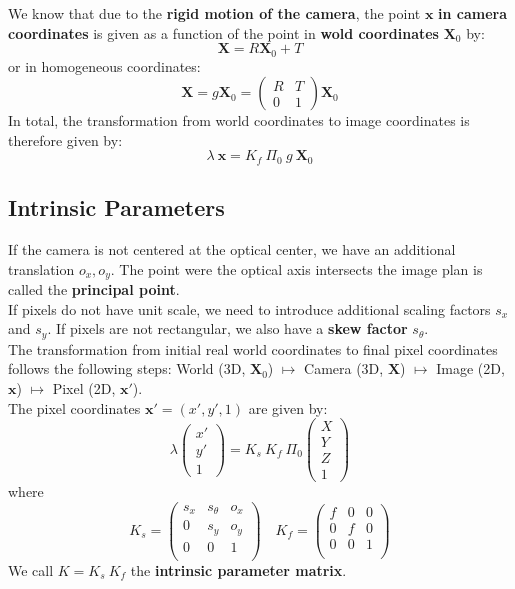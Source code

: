 We know that due to the \textbf{rigid motion of the camera},
the point $\bm{x}$ \textbf{in camera coordinates} is given as a function
of the point in \textbf{wold coordinates} $\bm{X}_0$ by:
\[\bm{X} = R \bm{X}_0 + T\]
or in homogeneous coordinates:
\[\bm{X} = g \bm{X}_0 = \begin{pmatrix}R & T \\ 0 & 1\end{pmatrix} \bm{X}_0\]
In total, the transformation from world coordinates to image coordinates
is therefore given by:
\[\boxed{\lambda\ \bm{x} = K_f\ \Pi_0\ g\ \bm{X}_0}\]


\subsection{Intrinsic Parameters}%
\label{sub:intrinsic_parameters}


If the camera is not centered at the optical center, we have an additional
translation $o_x, o_y$. The point were the optical axis intersects
the image plan is called the \textbf{principal point}.\\

If pixels do not have unit scale, we need to introduce
additional scaling factors $s_x$ and $s_y$.
If pixels are not rectangular, we also have a \textbf{skew factor} $s_{\theta}$.\\

The transformation from initial real world coordinates to final pixel coordinates
follows the following steps:
World (3D, $\bm{X}_0$) $\mapsto$ Camera (3D, $\bm{X}$)
$\mapsto$ Image (2D, $\bm{x}$) $\mapsto$ Pixel (2D, $\bm{x'}$).\\

The pixel coordinates $\bm{x'} = (x',y',1)$ are given by:
\[\lambda \begin{pmatrix}x' \\ y' \\ 1\end{pmatrix} =
	K_s\ K_f\ \Pi_0
	\begin{pmatrix}X \\ Y \\ Z \\ 1\end{pmatrix}
\]
where
\[K_s = \begin{pmatrix}
		s_x & s_{\theta} & o_x \\
		0 & s_y & o_y \\
		0 & 0 & 1 \\
	\end{pmatrix}
	\quad K_f =
	\begin{pmatrix}
		f & 0 & 0 \\
		0 & f & 0 \\
		0 & 0 & 1 \\
	\end{pmatrix}
\]
We call $K = K_s\ K_f$ the \textbf{intrinsic parameter matrix}.\\

